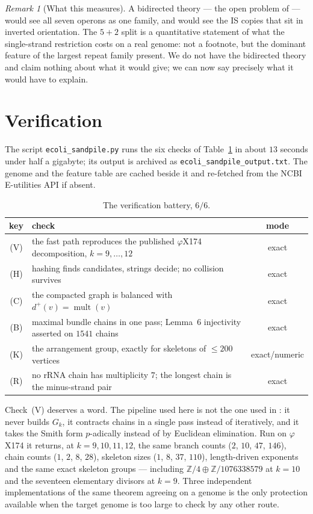 \documentclass[11pt]{article}
\theoremstyle{plain}
\theoremstyle{definition}
\theoremstyle{remark}
\newtheorem{remark}[theorem]{Remark}
\newcommand{\Z}{\mathbb{Z}}
\begin{document}
\begin{remark}[What this measures]\label{rem:bidirected}
A bidirected theory --- the open problem of \cite[Open (a)]{Bio2} --- would see all seven
operons as one family, and would see the IS copies that sit in inverted orientation. The
$5+2$ split is a quantitative statement of what the single-strand restriction costs on a
real genome: not a footnote, but the dominant feature of the largest repeat family
present. We do not have the bidirected theory and claim nothing about what it would give;
we can now say precisely what it would have to explain.
\end{remark}

\section{Verification}\label{sec:battery}

The script \texttt{ecoli\_sandpile.py} runs the six checks of Table~\ref{tab:battery} in
about $13$ seconds under half a gigabyte; its output is archived as
\texttt{ecoli\_sandpile\_output.txt}. The genome and the feature table are cached beside
it and re-fetched from the NCBI E-utilities API if absent.

\begin{table}[ht]
\centering\small
\begin{tabular}{clc}
\toprule
key & check & mode\\
\midrule
(V) & the fast path reproduces the published $\varphi$X174 decomposition, $k=9,\dots,12$ & exact\\
(H) & hashing finds candidates, strings decide; no collision survives & exact\\
(C) & the compacted graph is balanced with $d^{+}(v)=\operatorname{mult}(v)$ & exact\\
(B) & maximal bundle chains in one pass; Lemma~6 injectivity asserted on $1541$ chains & exact\\
(K) & the arrangement group, exactly for skeletons of $\le200$ vertices & exact/numeric\\
(R) & no rRNA chain has multiplicity $7$; the longest chain is the minus-strand pair & exact\\
\bottomrule
\end{tabular}
\caption{The verification battery, $6/6$.}
\label{tab:battery}
\end{table}

Check~(V) deserves a word. The pipeline used here is not the one used in \cite{Bio3}: it
never builds $G_k$, it contracts chains in a single pass instead of iteratively, and it
takes the Smith form $p$-adically instead of by Euclidean elimination. Run on
$\varphi$X174 it returns, at $k=9,10,11,12$, the same branch counts ($2$, $10$, $47$,
$146$), chain counts ($1$, $2$, $8$, $28$), skeleton sizes ($1$, $8$, $37$, $110$),
length-driven exponents and the same exact skeleton groups --- including
$\Z/4\oplus\Z/1076338579$ at $k=10$ and the seventeen elementary divisors at $k=9$. Three
independent implementations of the same theorem agreeing on a genome is the only
protection available when the target genome is too large to check by any other route.
\end{document}
